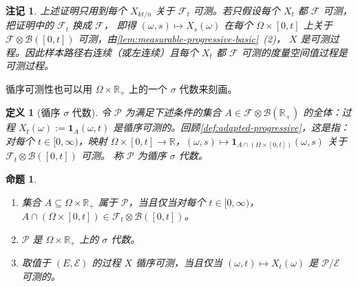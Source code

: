 \documentclass[UTF8,11pt,a4paper,oneside,fontset=fandol]{ctexrep}
\numberwithin{equation}{section}
\theoremstyle{zhthm}
\newtheorem{proposition}[theorem]{命题}
\newtheorem{definition}[theorem]{定义}
\newtheorem{remark}[theorem]{注记}
\newcommand{\R}{\mathbb{R}}
\newcommand{\B}{\mathcal{B}}
\newcommand{\F}{\mathcal{F}}
\newcommand{\ind}[1]{\mathbf{1}_{#1}}
\begin{document}
\begin{remark}
\label{rem:right-continuous-measurable}
上述证明只用到每个 $X_{kt/n}$ 关于 $\F_t$ 可测。若只假设每个 $X_t$ 都 $\F$ 可测，把证明中的 $\F_t$ 换成 $\F$，
即得 $(\omega,s)\mapsto X_s(\omega)$ 在每个 $\Omega\times[0,t]$ 上关于 $\F\otimes\B([0,t])$ 可测，由\cref{lem:measurable-progressive-basic}~(2)，
$X$ 是可测过程。因此样本路径右连续（或左连续）且每个 $X_t$ 都 $\F$ 可测的度量空间值过程是可测过程。
\end{remark}

循序可测性也可以用 $\Omega\times\R_+$ 上的一个 $\sigma$ 代数来刻画。

\begin{definition}[循序 $\sigma$ 代数]
\label{def:progressive-sigma-algebra}
令 $\mathscr P$ 为满足下述条件的集合 $A\in\F\otimes\B(\R_+)$ 的全体：过程 $X_t(\omega):=\ind A(\omega,t)$ 是循序可测的。回顾\cref{def:adapted-progressive}，这是指：对每个 $t\in[0,\infty)$，映射 $\Omega\times[0,t]\to\R$，$(\omega,s)\mapsto\ind{A\cap(\Omega\times[0,t])}(\omega,s)$ 关于 $\F_t\otimes\B([0,t])$ 可测。
称 $\mathscr P$ 为循序 $\sigma$ 代数。
\end{definition}

\begin{proposition}
\label{prop:progressive-sigma-algebra}
\begin{enumerate}[label=(\arabic*)]
  \item 集合 $A\subseteq\Omega\times\R_+$ 属于 $\mathscr P$，当且仅当对每个 $t\in[0,\infty)$，$A\cap(\Omega\times[0,t])\in\F_t\otimes\B([0,t])$。
  \item $\mathscr P$ 是 $\Omega\times\R_+$ 上的 $\sigma$ 代数。
  \item 取值于 $(E,\mathcal E)$ 的过程 $X$ 循序可测，当且仅当 $(\omega,t)\mapsto X_t(\omega)$ 是 $\mathscr P/\mathcal E$ 可测的。
\end{enumerate}
\end{proposition}
\end{document}
